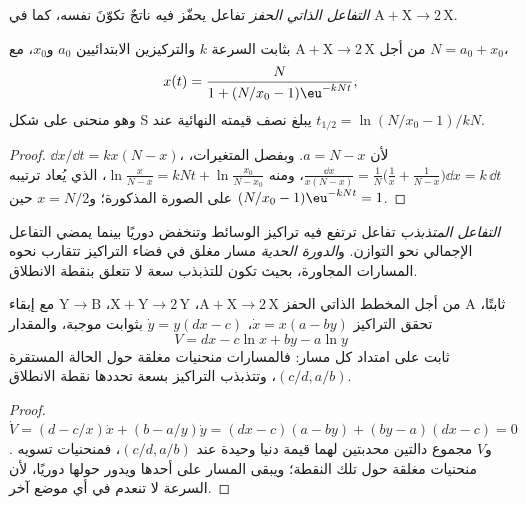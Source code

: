 \begin{definition}\label{def:b3:complex-kinetics:autocatalysis}
\emph{التفاعل الذاتي الحفز} تفاعل يحفّز فيه
ناتجٌ تكوّنَ نفسه، كما في $\mathrm{A + X \to 2\,X}$.
\end{definition}

\begin{proposition}\label{prop:b3:complex-kinetics:logistic}
من أجل $\mathrm{A + X \to 2\,X}$ بثابت السرعة $k$ والتركيزين الابتدائيين $a_0$ و$x_0$،
مع $N = a_0 + x_0$،
\[
  x(t) = \frac{N}{1 + (N/x_0 - 1)\eu^{-kNt}},
\]
وهو منحنى على شكل S يبلغ نصف قيمته النهائية عند $t_{1/2} = \ln(N/x_0 - 1)/kN$.
\end{proposition}

\begin{proof}
$\dd x/\dd t = kx(N - x)$، لأن $a = N - x$. وبفصل المتغيرات، $\frac{\dd x}{x(N - x)} = \frac1N\bigl(\frac1x + \frac{1}{N - x}\bigr)\dd x
= k\,\dd t$، ومنه $\ln\frac{x}{N - x} = kNt + \ln\frac{x_0}{N - x_0}$، الذي يُعاد ترتيبه على الصورة المذكورة؛
و$x = N/2$ حين $(N/x_0 - 1)\eu^{-kNt} = 1$.
\end{proof}

\begin{definition}\label{def:b3:complex-kinetics:oscillating}
\emph{التفاعل المتذبذب} تفاعل ترتفع فيه
تراكيز الوسائط وتنخفض دوريًا بينما يمضي التفاعل الإجمالي
نحو التوازن. و\emph{الدورة الحدية}
مسار مغلق في فضاء التراكيز تتقارب نحوه المسارات المجاورة،
بحيث تكون للتذبذب سعة لا تتعلق
بنقطة الانطلاق.
\end{definition}

\begin{theorem}\label{thm:b3:complex-kinetics:lotka-volterra}
من أجل المخطط الذاتي الحفز $\mathrm{A + X \to 2\,X}$، $\mathrm{X + Y \to 2\,Y}$، $\mathrm{Y \to B}$ مع إبقاء A
ثابتًا، تحقق التراكيز $\dot x = x(a - by)$، $\dot y = y(dx - c)$ بثوابت
موجبة، والمقدار
\[
  V = dx - c\ln x + by - a\ln y
\]
ثابت على امتداد كل مسار: فالمسارات منحنيات مغلقة حول
الحالة المستقرة $(c/d, a/b)$، وتتذبذب التراكيز بسعة
تحددها نقطة الانطلاق.
\end{theorem}

\begin{proof}
$\dot V = (d - c/x)\dot x + (b - a/y)\dot y = (dx - c)(a - by) + (by - a)(dx - c) = 0$. و$V$
مجموع دالتين محدبتين لهما قيمة دنيا وحيدة عند $(c/d, a/b)$، فمنحنيات
تسويه منحنيات مغلقة حول تلك النقطة؛ ويبقى المسار على أحدها
ويدور حولها دوريًا، لأن السرعة لا تنعدم في أي موضع آخر.
\end{proof}

